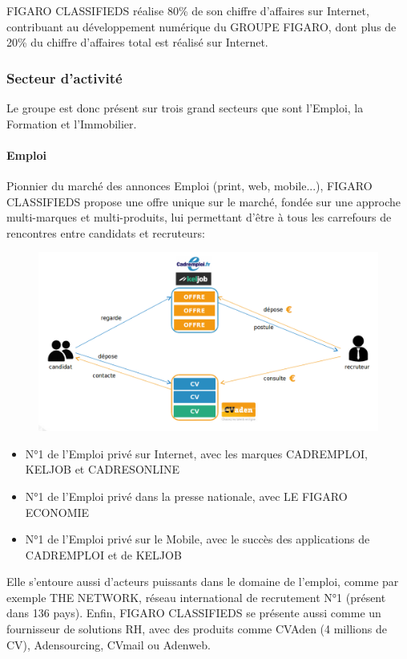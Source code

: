 FIGARO CLASSIFIEDS réalise 80\% de son chiffre d’affaires sur Internet, contribuant au développement numérique du GROUPE FIGARO, dont plus de 20\% du chiffre d’affaires total est réalisé sur Internet.

\subsubsection{Secteur d'activité}
Le groupe est donc présent sur trois grand secteurs que sont l’Emploi, la Formation et l’Immobilier.
\paragraph{Emploi}
Pionnier du marché des annonces Emploi (print, web, mobile...), FIGARO CLASSIFIEDS propose une offre unique sur le marché, fondée sur une approche multi-marques et multi-produits, lui permettant d'être à tous les carrefours de rencontres entre candidats et recruteurs:
\begin{figure}[b]
  \begin{center}
    \hspace*{-1in}
    \includegraphics[width=1.25\textwidth]{Pictures/EmploiFCMS.png}
  \end{center}
\end{figure}
\begin{itemize}
  \item N°1 de l'Emploi privé sur Internet, avec les marques CADREMPLOI, KELJOB et CADRESONLINE
  \item N°1 de l'Emploi privé dans la presse nationale, avec LE FIGARO ECONOMIE
  \item N°1 de l'Emploi privé sur le Mobile, avec le succès des applications de CADREMPLOI et de KELJOB
\end{itemize}
Elle s'entoure aussi d'acteurs puissants dans le domaine de l'emploi, comme par exemple THE NETWORK, réseau international de recrutement N°1 (présent dans 136 pays).
Enfin, FIGARO CLASSIFIEDS se présente aussi comme un fournisseur de solutions RH, avec des produits comme CVAden (4 millions de CV), Adensourcing, CVmail ou Adenweb.

